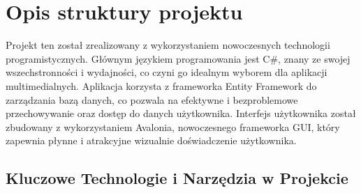 ﻿%
\chapter{Opis struktury projektu}

{Projekt ten został zrealizowany z wykorzystaniem nowoczesnych technologii programistycznych. Głównym językiem programowania jest C\#, znany ze swojej wszechstronności i wydajności, co czyni go idealnym wyborem dla aplikacji multimedialnych. Aplikacja korzysta z frameworka Entity Framework do zarządzania bazą danych, co pozwala na efektywne i bezproblemowe przechowywanie oraz dostęp do danych użytkownika. Interfejs użytkownika został zbudowany z wykorzystaniem Avalonia, nowoczesnego frameworka GUI, który zapewnia płynne i atrakcyjne wizualnie doświadczenie użytkownika.}

\section{Kluczowe Technologie i Narzędzia w Projekcie}

